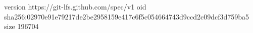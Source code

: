 version https://git-lfs.github.com/spec/v1
oid sha256:02970e91e79217de2be2958159e417c6f5c054664743d9ccd2c09dcf3d759ba5
size 196704
